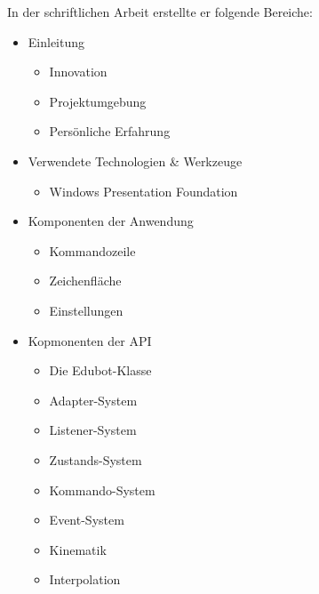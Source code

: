 \begin{itemize}
In der schriftlichen Arbeit erstellte er folgende Bereiche:
\begin{itemize}
\item Einleitung
\begin{itemize}
\item Innovation
\item Projektumgebung
\item Persönliche Erfahrung
\end{itemize}
\item Verwendete Technologien \& Werkzeuge
\begin{itemize}
\item Windows Presentation Foundation
\end{itemize}
\item Komponenten der Anwendung
\begin{itemize}
\item Kommandozeile
\item Zeichenfläche
\item Einstellungen
\end{itemize}
\item Kopmonenten der API
\begin{itemize}
\item Die Edubot-Klasse
\item Adapter-System
\item Listener-System
\item Zustands-System
\item Kommando-System
\item Event-System
\item Kinematik
\item Interpolation
\end{itemize}
\end{itemize}
     

\end{itemize}
